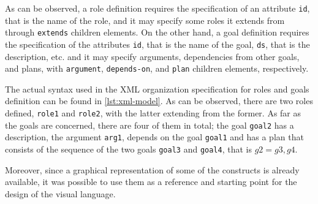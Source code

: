 As can be observed, a role definition requires the specification of an attribute \texttt{id}, that is the name of the role, and it may specify some roles it extends from through \texttt{extends} children elements.
On the other hand, a goal definition requires the specification of the attributes \texttt{id}, that is the name of the goal, \texttt{ds}, that is the description, etc. and it may specify arguments, dependencies from other goals, and plans, with \texttt{argument}, \texttt{depends-on}, and \texttt{plan} children elements, respectively.

\begin{figure}[H]
    
\end{figure}

The actual syntax used in the XML organization specification for roles and goals definition can be found in \cref{lst:xml-model}.
As can be observed, there are two roles defined, \texttt{role1} and \texttt{role2}, with the latter extending from the former.
As far as the goals are concerned, there are four of them in total; the goal \texttt{goal2} has a description, the argument \texttt{arg1}, depends on the goal \texttt{goal1} and has a plan that consists of the sequence of the two goals \texttt{goal3} and \texttt{goal4}, that is $g2 = g3,g4$.

\begin{figure}[H]
    
\end{figure}

Moreover, since a graphical representation of some of the \moise{} constructs is already available, it was possible to use them as a reference and starting point for the design of the visual language.

